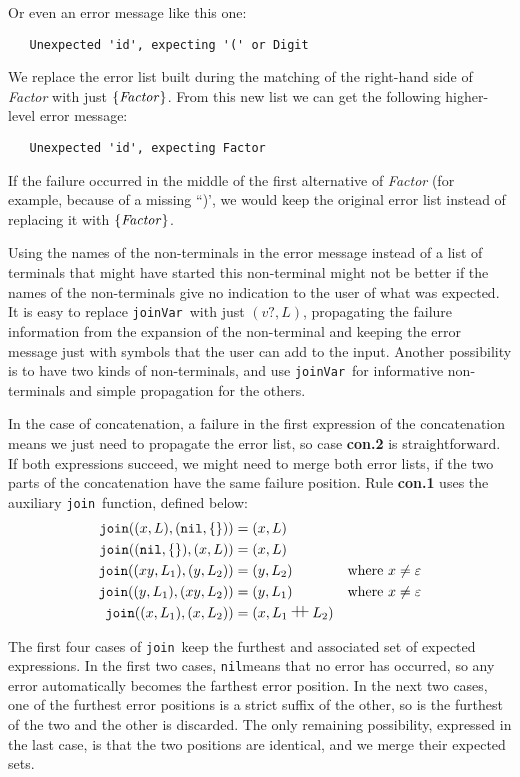 \documentclass[3p,12pt,singlecolumn]{elsarticle}
\newcommand{\Nil}{{\tt nil}}
\newcommand{\J}{{\tt join}}
\newcommand{\Jv}{{\tt joinVar}}
\def\drawplusplus#1#2#3{\hbox to 0pt{\hbox to #1{\hfill\vrule height #3 depth
      0pt width #2\hfill\vrule height #3 depth 0pt width #2\hfill
      }}\vbox to #3{\vfill\hrule height #2 depth 0pt width
      #1 \vfill}}
\def\concat{\mathrel{\drawplusplus {12pt}{0.4pt}{8pt}}}
\begin{document}
Or even an error message like this one:
\begin{verbatim}
   Unexpected 'id', expecting '(' or Digit
\end{verbatim}

We replace the error list built during the matching of
the right-hand side of {\it Factor} with just $\{ {\it Factor} \}$.
From this new list we can get the following higher-level
error message:
\begin{verbatim}
   Unexpected 'id', expecting Factor
\end{verbatim}

If the failure occurred in the middle of the first
alternative of {\it Factor} (for example, because of a missing ``)',
we would keep the original error list instead of replacing
it with $\{ {\it Factor} \}$.

Using the names of the non-terminals in the error message instead
of a list of terminals that might have started this non-terminal
might not be better if the names of the non-terminals give no
indication to the user of what was expected. It is easy
to replace \Jv\ with just $(v?,L)$, propagating the failure
information from the expansion of the non-terminal and keeping
the error message just with symbols that the user can add
to the input. Another possibility is to have two kinds of
non-terminals, and use \Jv\ for informative non-terminals and
simple propagation for the others.

In the case of concatenation, a failure in the first
expression of the concatenation means we just need to
propagate the error list, so case {\bf con.2} is
straightforward. If both expressions succeed, we might
need to merge both error lists, if the two parts
of the concatenation have the same failure position.
Rule {\bf con.1} uses the auxiliary \J\ function, 
defined below:
\begin{align*}
\J((x,L),(\Nil,\{\})) & =  (x,L) \\
\J((\Nil,\{\}),(x,L)) & =  (x,L) \\
\J((xy,L_1),(y,L_2)) & =  (y,L_2) & \mathrm{where}\ x \neq \varepsilon \\
\J((y,L_1),(xy,L_2)) & =  (y,L_1) & \mathrm{where}\ x \neq \varepsilon \\
\J((x,L_1),(x,L_2)) & =  (x,L_1 \concat L_2)
\end{align*}

The first four cases of \J\ keep the furthest
and associated set of expected expressions. In the first
two cases, \Nil means that no error has occurred,
so any error automatically becomes the farthest
error position. In the next two cases, one of the
furthest error positions is a strict suffix of the
other, so is the furthest of the two and the other
is discarded. The only remaining possibility,
expressed in the last case, is that
the two positions are identical, and we merge their
expected sets.
\end{document}
